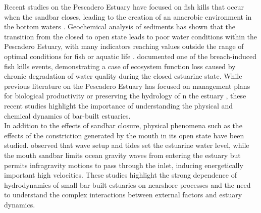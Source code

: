 \documentclass[tesis.tex]{subfiles}
\begin{document}
Recent studies on the Pescadero Estuary have focused on fish kills that occur when the sandbar closes, leading to the creation of an anaerobic environment in the bottom waters \citep{sloan2006ecological}. Geochemical analysis of sediments has shown that the transition from the closed to open state leads to poor water conditions within the Pescadero Estuary, with many indicators reaching values outside the range of optimal conditions for fish or aquatic life \citep{richards2018}. \cite{huber2020environmental} documented one of the breach-induced fish kills events, demonstrating a case of ecosystem function loss caused by chronic degradation of water quality during the closed estuarine state. While previous literature on the Pescadero Estuary has focused on management plans for biological productivity \citep{curry1985pescadero} or preserving the hydrology of n the estuary \citep{williams1990pescadero}, these recent studies highlight the importance of understanding the physical and chemical dynamics of bar-built estuaries.\\

In addition to the effects of sandbar closure, physical phenomena such as the effects of the constriction generated by the mouth in its open state have been studied. \cite{williams2016} observed that wave setup and tides set the estuarine water level, while the mouth sandbar limits ocean gravity waves from entering the estuary but permits infragravity motions to pass through the inlet, inducing energetically important high velocities. These studies highlight the strong dependence of hydrodynamics of small bar-built estuaries on nearshore processes and the need to understand the complex interactions between external factors and estuary dynamics.\\
\end{document}
